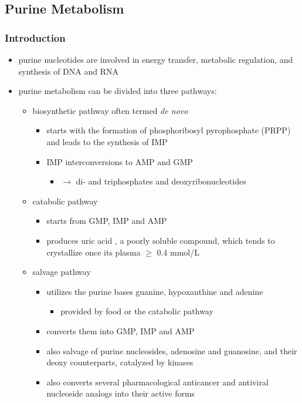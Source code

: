 \documentclass{scrartcl}
\begin{document}
\subsection{Purine Metabolism}
\label{sec:orgb611123}
\subsubsection{Introduction}
\label{sec:org312386d}
\begin{itemize}
\item purine nucleotides are involved in energy transfer, metabolic
regulation, and synthesis of DNA and RNA
\item purine metabolism can be divided into three pathways:
\begin{itemize}
\item biosynthetic pathway often termed \emph{de novo}
\begin{itemize}
\item starts with the formation of phosphoribosyl pyrophosphate (PRPP)
and leads to the synthesis of IMP
\item IMP interconversions to AMP and GMP
\begin{itemize}
\item \(\to\) di- and triphosphates and deoxyribonucleotides
\end{itemize}
\end{itemize}
\item catabolic pathway
\begin{itemize}
\item starts from GMP, IMP and AMP
\item produces uric acid , a poorly soluble compound, which tends to
crystallize once its plasma \(\ge\) 0.4 mmol/L
\end{itemize}
\item salvage pathway
\begin{itemize}
\item utilizes the purine bases guanine, hypoxanthine and adenine
\begin{itemize}
\item provided by food or the catabolic pathway
\end{itemize}
\item converts them into GMP, IMP and AMP
\item also salvage of purine nucleosides, adenosine and guanosine, and
their deoxy counterparts, catalyzed by kinases
\item also converts several pharmacological anticancer and antiviral
nucleoside analogs into their active forms
\end{itemize}
\end{itemize}


\end{itemize}
\end{document}
